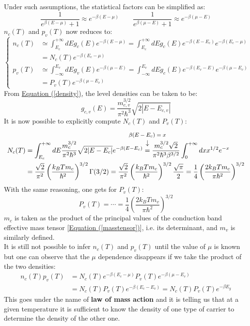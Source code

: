 \documentclass[10.75pt,a4paper,openright,bottom=2cm]{article}
\renewcommand{\refeq}[1]{\hyperref[#1]{Equation (\ref{#1})}}
\begin{document}
Under such assumptions, the statistical factors can be simplified as:
\[
\frac{1}{e^{\beta(E-\mu)}+1}\approx e^{-\beta(E-\mu)} \qquad \frac{1}{e^{\beta(\mu-E)}+1}\approx e^{-\beta(\mu-E)}
\]
$n_c(T)$ and $p_v(T)$ now reduces to:
\begin{equation}
\label{ncpv}
\left\{
\begin{aligned}
n_c(T)&\simeq\int_{E_c}^{+\infty} dEg_c(E)e^{-\beta(E-\mu)}=\int_{E_c}^{+\infty} dEg_c(E)e^{-\beta(E-E_c)}e^{-\beta(E_c-\mu)}\\
&=N_c(T)e^{-\beta(E_c-\mu)}\\
p_v(T)&\simeq\int_{-\infty}^{E_v} dEg_v(E)e^{-\beta(\mu-E)}=\int_{-\infty}^{E_v} dEg_c(E)e^{-\beta(E_v-E)}e^{-\beta(\mu-E_v)}\\
&=P_v(T)e^{-\beta(\mu-E_v)}
\end{aligned}
\right.
\end{equation}
From \refeq{density}, 
the level densities can be taken to be:
\[
g_{c,v}(E)=\frac{m_{c,v}^{3/2}}{\pi^2\hbar^3}\sqrt{2|E-E_{c,v}|}
\]
It is now possible to explicitly compute $N_c(T)$ and $P_v(T)$:
\begin{align*}
N_c(T)&=\int_{E_c}^{+\infty} dE\frac{m_c^{3/2}}{\pi^2\hbar^3}\sqrt{2|E-E_c|}e^{-\beta(E-E_c)}\overset{\mathclap{\tikz \node {$\downarrow$} node [above=1ex] {\footnotesize $\beta(E-E_c)=x$ };}}
{=}\frac{m_c^{3/2}\sqrt{2}}{\pi^2\hbar^3\beta^{3/2}}\int_0^{+\infty}dxx^{1/2}e^{-x}\\
&=\frac{\sqrt{2}}{\pi^2}\left(\frac{k_BTm_c}{\hbar^2}\right)^{3/2}\Gamma(3/2)=\frac{\sqrt{2}}{\pi^2}\left(\frac{k_BTm_c}{\hbar^2}\right)^{3/2}\frac{\sqrt{\pi}}{2}=\frac{1}{4}\left(\frac{2k_BTm_c}{\pi\hbar^2}\right)^{3/2}
\end{align*}
With the same reasoning, one gets for $P_v(T)$:
\[
P_v(T)=\cdots=\frac{1}{4}\left(\frac{2k_BTm_v}{\pi\hbar^2}\right)^{3/2}
\]
$m_c$ is taken as the product of the principal values of the conduction band effective mass tensor [\refeq{masstensor}], i.e. its determinant, and $m_v$ is similarly defined.\\
It is still not possible to infer $n_c(T)$ and $p_v(T)$ until the value of $\mu$ is known but one can observe that the $\mu$ dependence disappears if we take the product of the two densities:
\begin{align*}
n_c(T)p_v(T)&=N_c(T)e^{-\beta(E_c-\mu)}P_v(T)e^{-\beta(\mu-E_v)}\\
&=N_c(T)P_v(T)e^{-\beta(E_c-E_v)}=N_c(T)P_v(T)e^{-\beta E_g}
\end{align*}
This goes under the name of \textbf{law of mass action} and it is telling us that at a given temperature it is sufficient to know the density of one type of carrier to determine the density of the other one.
\end{document}

